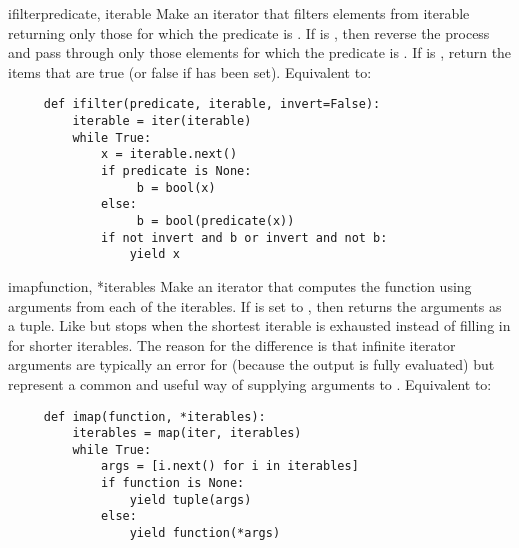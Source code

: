 \begin{funcdesc}{ifilter}{predicate, iterable }
  Make an iterator that filters elements from iterable returning only
  those for which the predicate is .  If
   is , then reverse the process and pass through
  only those elements for which the predicate is .
  If  is , return the items that are true
  (or false if  has been set).  Equivalent to:

  \begin{verbatim}
     def ifilter(predicate, iterable, invert=False):
         iterable = iter(iterable)
         while True:
             x = iterable.next()
             if predicate is None:
                  b = bool(x)
             else:
                  b = bool(predicate(x))
             if not invert and b or invert and not b:
                 yield x
  \end{verbatim}
\end{funcdesc}

\begin{funcdesc}{imap}{function, *iterables}
  Make an iterator that computes the function using arguments from
  each of the iterables.  If  is set to , then
   returns the arguments as a tuple.  Like
   but stops when the shortest iterable is exhausted
  instead of filling in  for shorter iterables.  The reason
  for the difference is that infinite iterator arguments are typically
  an error for  (because the output is fully evaluated)
  but represent a common and useful way of supplying arguments to
  .
  Equivalent to:

  \begin{verbatim}
     def imap(function, *iterables):
         iterables = map(iter, iterables)
         while True:
             args = [i.next() for i in iterables]
             if function is None:
                 yield tuple(args)
             else:
                 yield function(*args)
  \end{verbatim}
\end{funcdesc}

